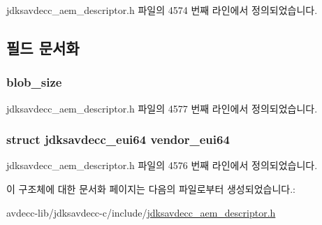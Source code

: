 jdksavdecc\+\_\+aem\+\_\+descriptor.\+h 파일의 4574 번째 라인에서 정의되었습니다.



\subsection{필드 문서화}
\subsubsection[{\texorpdfstring{blob\+\_\+size}{blob_size}}]{ blob\+\_\+size}\hypertarget{structjdksavdecc__values__vendor_a32143551b70893faef60f6e35f88ed50}{}\label{structjdksavdecc__values__vendor_a32143551b70893faef60f6e35f88ed50}


jdksavdecc\+\_\+aem\+\_\+descriptor.\+h 파일의 4577 번째 라인에서 정의되었습니다.

\subsubsection[{\texorpdfstring{vendor\+\_\+eui64}{vendor_eui64}}]{\setlength{\rightskip}{0pt plus 5cm}struct {\bf jdksavdecc\+\_\+eui64} vendor\+\_\+eui64}\hypertarget{structjdksavdecc__values__vendor_a6183c85748a8af0003d293d653c4ae9b}{}\label{structjdksavdecc__values__vendor_a6183c85748a8af0003d293d653c4ae9b}


jdksavdecc\+\_\+aem\+\_\+descriptor.\+h 파일의 4576 번째 라인에서 정의되었습니다.



이 구조체에 대한 문서화 페이지는 다음의 파일로부터 생성되었습니다.\+:\begin{DoxyCompactItemize}
\item 
avdecc-\/lib/jdksavdecc-\/c/include/\hyperlink{jdksavdecc__aem__descriptor_8h}{jdksavdecc\+\_\+aem\+\_\+descriptor.\+h}\end{DoxyCompactItemize}
